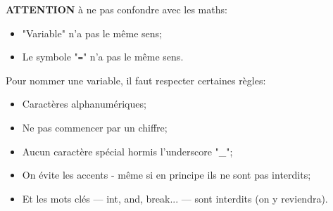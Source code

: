\documentclass[12pt]{article}
\begin{document}
	\textbf{ATTENTION} à ne pas confondre avec les maths:
	
	\begin{itemize}
		\item "Variable" n'a pas le même sens;
		\item Le symbole "\texttt{=}" n'a pas le même sens.
	\end{itemize}

	Pour nommer une variable, il faut respecter certaines règles: 
	\begin{itemize}
		\item Caractères alphanumériques;
		\item Ne pas commencer par un chiffre;
		\item Aucun caractère spécial hormis l'underscore "\_";
		\item On évite les accents - même si en principe ils ne sont pas interdits;
		\item Et les mots clés --- int, and, break... --- sont interdits (on y reviendra).
	\end{itemize}
\end{document}
